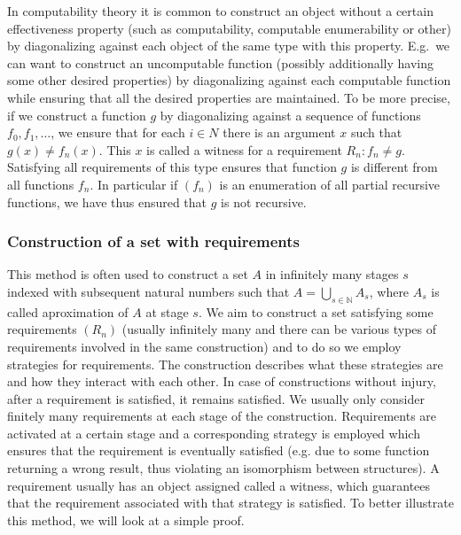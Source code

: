 \documentclass{pracalicmgr2025}
\theoremstyle{plain}            %
\theoremstyle{remark}           %
\theoremstyle{definition}       %
\begin{document}
In computability theory it is common to construct an object without a certain effectiveness property (such as computability, computable enumerability or other) by diagonalizing against each object of the same type with this property. E.g.\ we can want to construct an uncomputable function (possibly additionally having some other desired
properties) by diagonalizing against each computable function while ensuring that all the desired
properties are maintained. To be more precise, if we construct a function $g$ by diagonalizing against a sequence of functions $f_0, f_1, \dots$, we ensure that for each $i \in N$ there is an argument $x$ such that $g(x) \neq f_n(x)$. This $x$ is called a witness for a requirement $R_n: f_n \neq g$. Satisfying all requirements of this type ensures that function $g$ is different from all functions $f_n$. In particular if $(f_n)$ is an enumeration of all partial recursive functions, we have thus ensured that $g$ is not recursive. 

\subsubsection{Construction of a set with requirements}
This method is often used to construct a set $A$ in infinitely many stages $s$ indexed with subsequent natural numbers such that $A = \bigcup_{s \in \mathbb{N}} A _s$, where $A_s$ is called aproximation of $A$ at stage $s$. We aim to construct a set satisfying some requirements $(R_n)$ (usually infinitely many and there can be various types of requirements involved in the same construction) and to do so we employ strategies for requirements. The construction describes what these strategies are and how they interact with
each other. In case of constructions without injury, after a requirement is satisfied, it remains
satisfied. We usually only consider finitely many requirements at each stage of the construction. Requirements are activated at a certain stage and a corresponding strategy is employed which ensures that the
requirement is eventually satisfied (e.g. due to some function returning a wrong result, thus violating
an isomorphism between structures). A requirement usually has an object assigned called a witness,
which guarantees that the requirement associated with that strategy is satisfied.
To better illustrate this method, we will look at a simple proof.
\end{document}
